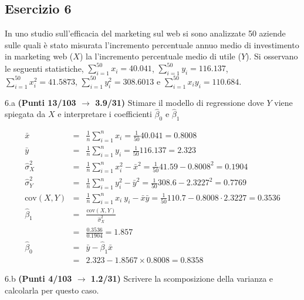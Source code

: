 \documentclass[
  11pt,
]{book}
\theoremstyle{mytheoremstyle}
\theoremstyle{mydefstyle}
\newenvironment{sol}
  {
  \begin{tcolorbox}[enhanced,breakable,arc=0.1mm,boxrule=1pt,colback=white,colframe=iblue,
  title=\bf \fontfamily{lmss}\selectfont \hspace{.5 cm} Soluzione,drop fuzzy shadow]

}{
\end{tcolorbox}
  }
\begin{document}
\subsection{Esercizio 6}\label{esercizio-6-25}

In uno studio sull'efficacia del marketing sul web si sono analizzate 50 aziende
sulle quali è stato misurata l'incremento percentuale annuo medio di investimento in marketing
web (\(X\)) la l'incremento percentuale medio di utile (\(Y\)). Si osservano le seguenti statistiche, \(\sum_{i=1}^{50}x_i=40.041\), \(\sum_{i=1}^{50}y_i=116.137\),
\(\sum_{i=1}^{50}x_i^2=41.5873\), \(\sum_{i=1}^{50}y_i^2=308.6013\) e \(\sum_{i=1}^{50}x_iy_i=110.684\).

6.a \textbf{(Punti 13/103 \(\rightarrow\) 3.9/31)} Stimare il modello di regressione dove \(Y\) viene spiegata da \(X\) e interpretare
i coefficienti \(\hat\beta_0\) e \(\hat\beta_1\)

\begin{sol}
\begin{eqnarray*}
           \bar x &=&\frac 1 n\sum_{i=1}^n x_i = \frac {1}{ 50 }  40.041 =  0.8008 \\
           \bar y &=&\frac 1 n\sum_{i=1}^n y_i = \frac {1}{ 50 }  116.137 =  2.323 \\
           \hat\sigma_X^2&=&\frac 1 n\sum_{i=1}^n x_i^2-\bar x^2=\frac {1}{ 50 }  41.59  - 0.8008 ^2= 0.1904 \\
           \hat\sigma_Y^2&=&\frac 1 n\sum_{i=1}^n y_i^2-\bar y^2=\frac {1}{ 50 }  308.6  - 2.3227 ^2= 0.7769 \\
           \text{cov}(X,Y)&=&\frac 1 n\sum_{i=1}^n x_i~y_i-\bar x\bar y=\frac {1}{ 50 }  110.7 - 0.8008 \cdot 2.3227 = 0.3536 \\
           \hat\beta_1 &=& \frac{\text{cov}(X,Y)}{\hat\sigma_X^2} \\
                    &=& \frac{ 0.3536 }{ 0.1904 }  =  1.857 \\
           \hat\beta_0 &=& \bar y - \hat\beta_1 \bar x\\
                    &=&  2.323 - 1.8567 \times  0.8008 = 0.8358 
         \end{eqnarray*}

\end{sol}

6.b \textbf{(Punti 4/103 \(\rightarrow\) 1.2/31)} Scrivere la scomposizione della varianza e
calcolarla per questo caso.
\end{document}
